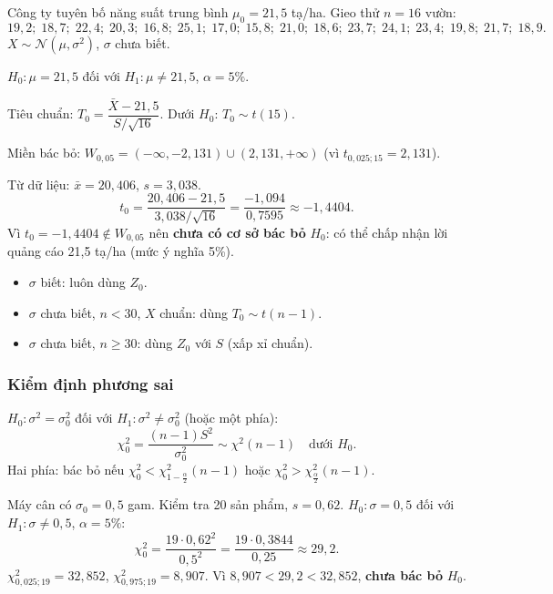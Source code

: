 \documentclass[12pt,a4paper]{article}
\begin{document}
\begin{vidu}[title={Kiểm định năng suất hạt giống - kiểm định $t$}]
Công ty tuyên bố năng suất trung bình $\mu_0 = 21{,}5$ tạ/ha. Gieo thử $n=16$ vườn:
\[
  19{,}2;\; 18{,}7;\; 22{,}4;\; 20{,}3;\; 16{,}8;\; 25{,}1;\; 17{,}0;\; 15{,}8;\; 21{,}0;\; 18{,}6;\; 23{,}7;\; 24{,}1;\; 23{,}4;\; 19{,}8;\; 21{,}7;\; 18{,}9.
\]
$X \sim \mathcal{N}(\mu,\sigma^2)$, $\sigma$ chưa biết.

\medskip
$H_0: \mu = 21{,}5$ đối với $H_1: \mu \ne 21{,}5$, $\alpha = 5\%$.

Tiêu chuẩn: $T_0 = \dfrac{\bar{X} - 21{,}5}{S/\sqrt{16}}$. Dưới $H_0$: $T_0 \sim t(15)$.

Miền bác bỏ: $W_{0{,}05} = (-\infty, -2{,}131) \cup (2{,}131, +\infty)$ (vì $t_{0{,}025;15} = 2{,}131$).

\medskip
Từ dữ liệu: $\bar{x} = 20{,}406$, $s = 3{,}038$.
\[
  t_0 = \dfrac{20{,}406 - 21{,}5}{3{,}038/\sqrt{16}} = \dfrac{-1{,}094}{0{,}7595} \approx -1{,}4404.
\]
Vì $t_0 = -1{,}4404 \notin W_{0{,}05}$ nên \textbf{chưa có cơ sở bác bỏ} $H_0$: có thể chấp nhận lời quảng cáo 21{,}5 tạ/ha (mức ý nghĩa 5\%).
\end{vidu}

\begin{luuy}[title={Chọn $z$ hay $t$}]
\begin{itemize}
  \item $\sigma$ biết: luôn dùng $Z_0$.
  \item $\sigma$ chưa biết, $n < 30$, $X$ chuẩn: dùng $T_0 \sim t(n-1)$.
  \item $\sigma$ chưa biết, $n \ge 30$: dùng $Z_0$ với $S$ (xấp xỉ chuẩn).
\end{itemize}
\end{luuy}

\subsubsection{Kiểm định phương sai}

\begin{congthuc}[title={Kiểm định $\chi^2$ cho $\sigma^2$}]
  $H_0: \sigma^2 = \sigma_0^2$ đối với $H_1: \sigma^2 \ne \sigma_0^2$ (hoặc một phía):
  \[
    \chi^2_0 = \dfrac{(n-1)S^2}{\sigma_0^2} \sim \chi^2(n-1) \quad \text{dưới } H_0.
  \]
  Hai phía: bác bỏ nếu $\chi^2_0 < \chi^2_{1-\frac{\alpha}{2}}(n-1)$ hoặc $\chi^2_0 > \chi^2_{\frac{\alpha}{2}}(n-1)$.
\end{congthuc}

\begin{vidu}[title={Kiểm định phương sai máy cân}]
Máy cân có $\sigma_0 = 0{,}5$ gam. Kiểm tra 20 sản phẩm, $s = 0{,}62$. $H_0: \sigma = 0{,}5$ đối với $H_1: \sigma \ne 0{,}5$, $\alpha=5\%$:
\[
  \chi^2_0 = \dfrac{19 \cdot 0{,}62^2}{0{,}5^2} = \dfrac{19 \cdot 0{,}3844}{0{,}25} \approx 29{,}2.
\]
$\chi^2_{0{,}025;19} = 32{,}852$, $\chi^2_{0{,}975;19} = 8{,}907$. Vì $8{,}907 < 29{,}2 < 32{,}852$, \textbf{chưa bác bỏ} $H_0$.
\end{vidu}
\end{document}
